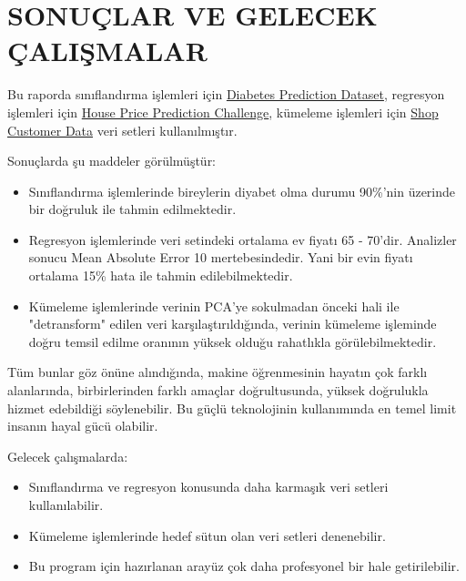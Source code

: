 \newpage
\section{SONUÇLAR VE GELECEK ÇALIŞMALAR}

Bu raporda sınıflandırma işlemleri için \href{https://www.kaggle.com/datasets/iammustafatz/diabetes-prediction-dataset/data}{Diabetes Prediction Dataset}, regresyon işlemleri için \href{https://www.kaggle.com/datasets/anmolkumar/house-price-prediction-challenge/data}{House Price Prediction Challenge}, kümeleme işlemleri için \href{https://www.kaggle.com/datasets/datascientistanna/customers-dataset/data}{Shop Customer Data} veri setleri kullanılmıştır.

Sonuçlarda şu maddeler görülmüştür:
\begin{itemize}
\item Sınıflandırma işlemlerinde bireylerin diyabet olma durumu 90\%'nin üzerinde bir doğruluk ile tahmin edilmektedir.
\item Regresyon işlemlerinde veri setindeki ortalama ev fiyatı 65 - 70'dir. Analizler sonucu Mean Absolute Error 10 mertebesindedir. Yani bir evin fiyatı ortalama 15\% hata ile tahmin edilebilmektedir.
\item Kümeleme işlemlerinde verinin PCA'ye sokulmadan önceki hali ile "detransform" edilen veri karşılaştırıldığında, verinin kümeleme işleminde doğru temsil edilme oranının yüksek olduğu rahatlıkla görülebilmektedir.
\end{itemize}

Tüm bunlar göz önüne alındığında, makine öğrenmesinin hayatın çok farklı alanlarında, birbirlerinden farklı amaçlar doğrultusunda, yüksek doğrulukla hizmet edebildiği söylenebilir. Bu güçlü teknolojinin kullanımında en temel limit insanın hayal gücü olabilir.

Gelecek çalışmalarda:
\begin{itemize}
\item Sınıflandırma ve regresyon konusunda daha karmaşık veri setleri kullanılabilir.
\item Kümeleme işlemlerinde hedef sütun olan veri setleri denenebilir.
\item Bu program için hazırlanan arayüz çok daha profesyonel bir hale getirilebilir.
\end{itemize}